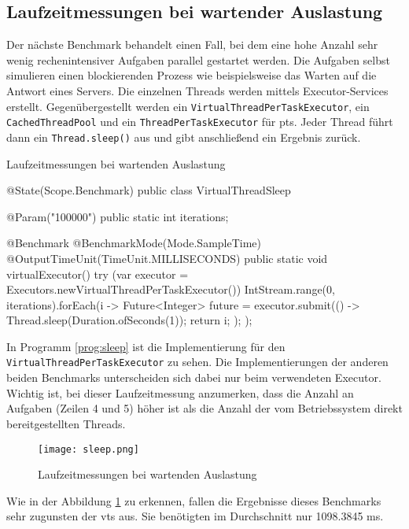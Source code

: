 \subsection{Laufzeitmessungen bei wartender Auslastung}                                         
\label{subsec:sleep}

    Der nächste Benchmark behandelt einen Fall, bei dem eine hohe Anzahl sehr wenig rechenintensiver Aufgaben parallel gestartet werden. Die Aufgaben selbst simulieren einen blockierenden
    Prozess wie beispielsweise das
    Warten auf die Antwort eines Servers. Die einzelnen Threads werden mittels Executor-Services erstellt. Gegenübergestellt werden ein \texttt{VirtualThreadPerTaskExecutor}, ein \texttt{CachedThreadPool}
    und ein \texttt{ThreadPerTaskExecutor} für \Glspl{pt}. Jeder Thread führt dann ein \texttt{Thread.sleep()} aus und gibt anschließend ein Ergebnis zurück. 
    \begin{program} [H]
        \caption{Laufzeitmessungen bei wartenden Auslastung}
        \label{prog:sleep}
    \begin{JavaCode}[language=Java, numbers=left]
@State(Scope.Benchmark)
public class VirtualThreadSleep {

    @Param("100000")
    public static int iterations;

    @Benchmark
    @BenchmarkMode(Mode.SampleTime)
    @OutputTimeUnit(TimeUnit.MILLISECONDS)
    public static void virtualExecutor() { 
        try (var executor = Executors.newVirtualThreadPerTaskExecutor()) {
            IntStream.range(0, iterations).forEach(i -> {
                Future<Integer> future = executor.submit(() -> {
                    Thread.sleep(Duration.ofSeconds(1)); return i;
                });
            });
        }
    }
}\end{JavaCode}
    \end{program}
    In Programm \ref{prog:sleep} ist die Implementierung für den \texttt{VirtualThreadPerTaskExecutor} zu sehen. Die Implementierungen der anderen beiden Benchmarks unterscheiden sich dabei nur beim verwendeten 
    Executor. Wichtig ist, bei dieser Laufzeitmessung anzumerken, dass die Anzahl an Aufgaben (Zeilen 4 und  5) höher ist als die Anzahl der vom Betriebssystem direkt bereitgestellten Threads.
    \begin{figure}[H]
        \centering
        \texttt{[image: sleep.png]}
        \caption{Laufzeitmessungen bei wartenden Auslastung}
        \label{fig:sleep}
    \end{figure}
    Wie in der Abbildung \ref{fig:sleep} zu erkennen, fallen die Ergebnisse dieses Benchmarks sehr zugunsten der \Glspl{vt} aus. Sie benötigten im Durchschnitt  nur 1098.3845 ms. 
